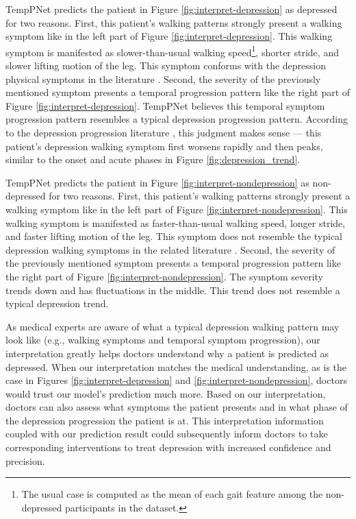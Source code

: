 \documentclass[mnsc]{informs3b} %
\begin{document}
TempPNet predicts the patient in Figure \ref{fig:interpret-depression} as depressed for two reasons. First, this patient's walking patterns strongly present a walking symptom like in the left part of Figure \ref{fig:interpret-depression}. This walking symptom is manifested as slower-than-usual walking speed\footnote{The usual case is computed as the mean of each gait feature among the non-depressed participants in the dataset.}, shorter stride, and slower lifting motion of the leg. This symptom conforms with the depression physical symptoms in the literature \citep{sloman_gait_1982,lemke_spatiotemporal_2000,nhs_symptoms_2022}. Second, the severity of the previously mentioned symptom presents a temporal progression pattern like the right part of Figure \ref{fig:interpret-depression}. TempPNet believes this temporal symptom progression pattern resembles a typical depression progression pattern. According to the depression progression literature \citep{bockting_lifetime_2015,dattani_mental_2021}, this judgment makes sense — this patient's depression walking symptom first worsens rapidly and then peaks, similar to the onset and acute phases in Figure \ref{fig:depression_trend}.

TempPNet predicts the patient in Figure \ref{fig:interpret-nondepression} as non-depressed for two reasons. First, this patient's walking patterns strongly present a walking symptom like in the left part of Figure \ref{fig:interpret-nondepression}. This walking symptom is manifested as faster-than-usual walking speed, longer stride, and faster lifting motion of the leg. This symptom does not resemble the typical depression walking symptoms in the related literature \citep{sloman_gait_1982,lemke_spatiotemporal_2000,nhs_symptoms_2022}. Second, the severity of the previously mentioned symptom presents a temporal progression pattern like the right part of Figure \ref{fig:interpret-nondepression}. The symptom severity trends down and has fluctuations in the middle. This trend does not resemble a typical depression trend.

As medical experts are aware of what a typical depression walking pattern may look like (e.g., walking symptoms and temporal symptom progression), our interpretation greatly helps doctors understand why a patient is predicted as depressed. When our interpretation matches the medical understanding, as is the case in Figures \ref{fig:interpret-depression} and \ref{fig:interpret-nondepression}, doctors would trust our model’s prediction much more. Based on our interpretation, doctors can also assess what symptoms the patient presents and in what phase of the depression progression the patient is at. This interpretation information coupled with our prediction result could subsequently inform doctors to take corresponding interventions to treat depression with increased confidence and precision.
\end{document}

